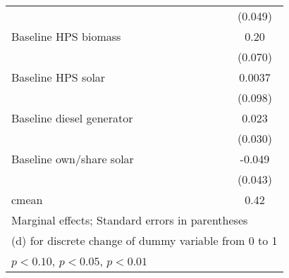 \begin{table}[htbp]
\begin{tabular*}{1\hsize}{@{\hskip\tabcolsep\extracolsep\fill}l*{5}{c}}
                &                  &                  &                  &                  &  (0.049)         \\
Baseline HPS biomass&                  &                  &                  &                  &     0.20\sym{***}\\
                &                  &                  &                  &                  &  (0.070)         \\
Baseline HPS solar&                  &                  &                  &                  &   0.0037         \\
                &                  &                  &                  &                  &  (0.098)         \\
Baseline diesel generator&                  &                  &                  &                  &    0.023         \\
                &                  &                  &                  &                  &  (0.030)         \\
Baseline own/share solar&                  &                  &                  &                  &   -0.049         \\
                &                  &                  &                  &                  &  (0.043)         \\
\midrule
cmean           &                  &                  &                  &                  &     0.42         \\
\bottomrule
\multicolumn{6}{l}{\footnotesize Marginal effects; Standard errors in parentheses}\\
\multicolumn{6}{l}{\footnotesize  (d) for discrete change of dummy variable from 0 to 1}\\
\multicolumn{6}{l}{\footnotesize \sym{*} \(p<0.10\), \sym{**} \(p<0.05\), \sym{***} \(p<0.01\)}\\
\end{tabular*}
\end{table}
